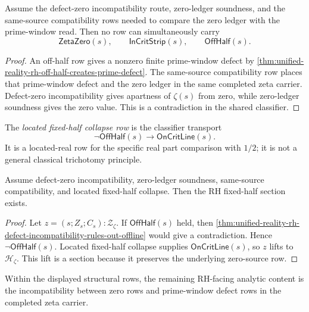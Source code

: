 \begin{theorem}
\label{thm:unified-reality-rh-defect-incompatibility-rules-out-offline}
Assume the defect-zero incompatibility route, zero-ledger soundness, and
the same-source compatibility rows needed to compare the zero ledger
with the prime-window read. Then no row can simultaneously carry
$$
\mathsf{ZetaZero}(s),\qquad
\mathsf{InCritStrip}(s),\qquad
\mathsf{OffHalf}(s).
$$
\end{theorem}

\begin{proof}
An off-half row gives a nonzero finite prime-window defect by
\autoref{thm:unified-reality-rh-off-half-creates-prime-defect}. The
same-source compatibility row places that prime-window defect and the
zero ledger in the same completed zeta carrier. Defect-zero
incompatibility gives apartness of $\zeta(s)$ from zero, while
zero-ledger soundness gives the zero value. This is a contradiction in
the shared classifier.
\end{proof}

\begin{definition}
\label{def:unified-reality-rh-located-fixed-half-collapse}
The \emph{located fixed-half collapse row} is the classifier transport
$$
\neg\mathsf{OffHalf}(s)\to\mathsf{OnCritLine}(s).
$$
It is a located-real row for the specific real part comparison with
$1/2$; it is not a general classical trichotomy principle.
\end{definition}

\begin{theorem}
\label{thm:unified-reality-rh-rigidity-package-implies-section}
Assume defect-zero incompatibility, zero-ledger soundness, same-source
compatibility, and located fixed-half collapse. Then the RH fixed-half
section exists.
\end{theorem}

\begin{proof}
Let $z=(s;Z_s;C_s):\mathcal Z_{\zeta}$. If
$\mathsf{OffHalf}(s)$ held, then
\autoref{thm:unified-reality-rh-defect-incompatibility-rules-out-offline}
would give a contradiction. Hence $\neg\mathsf{OffHalf}(s)$. Located
fixed-half collapse supplies $\mathsf{OnCritLine}(s)$, so $z$ lifts to
$\mathcal H_{\zeta}$. This lift is a section because it preserves the
underlying zero-source row.
\end{proof}

\begin{corollary}
\label{cor:unified-reality-rh-analytic-content-zero-defect-rigidity}
Within the displayed structural rows, the remaining RH-facing analytic
content is the incompatibility between zero rows and prime-window
defect rows in the completed zeta carrier.
\end{corollary}

